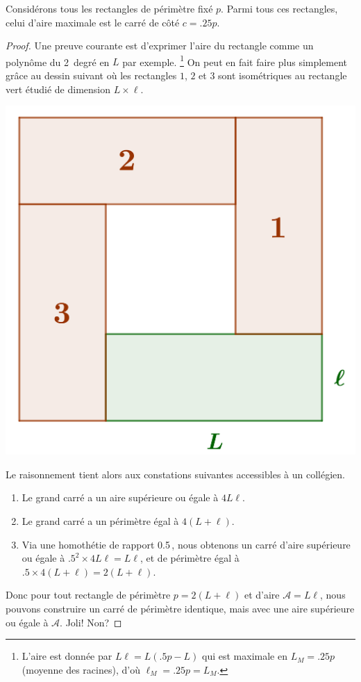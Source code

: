 \begin{fact} \label{iso-rect}
	Considérons tous les rectangles de périmètre fixé $p$. Parmi tous ces rectangles, celui d'aire maximale est le carré de côté $c = \num{.25} p$.
\end{fact}


\begin{proof}
	Une preuve courante est d'exprimer l'aire du rectangle comme un polynôme du 2\ieme\ degré en $L$ par exemple.%
	\footnote{
		L'aire est donnée par $L \ell = L (\num{.5} p - L)$ qui est maximale en $L_M = \num{.25} p$ (moyenne des racines), d'où $\ell_M = \num{.25} p = L_M$.
	}
	On peut en fait faire plus simplement grâce au dessin suivant où les rectangles $1$, $2$ et $3$ sont isométriques au rectangle vert étudié de dimension $L \times \ell$.

	\begin{center}
		\includegraphics[scale=.4]{content/rectangle/rectangle.png}
	\end{center}
	
	Le raisonnement tient alors aux constations suivantes accessibles à un collégien.
	\begin{enumerate}
		\item Le grand carré a un aire supérieure ou égale à $4 L \ell$.

		\item Le grand carré a un périmètre égal à $4 (L + \ell)$.

		\item Via une homothétie de rapport \num{.5}\,, nous obtenons un carré d'aire supérieure ou égale à $\num{.5}^2 \times 4 L \ell =  L \ell$, et de périmètre égal à $\num{.5} \times 4 (L + \ell) = 2 (L + \ell)$.
	\end{enumerate}
	
	Donc pour tout rectangle de périmètre $p = 2 (L + \ell)$ et d'aire $\mathscr{A} = L \ell$, nous pouvons construire un carré de périmètre identique, mais avec une aire supérieure ou égale à $\mathscr{A}$. Joli! Non?
\end{proof}


